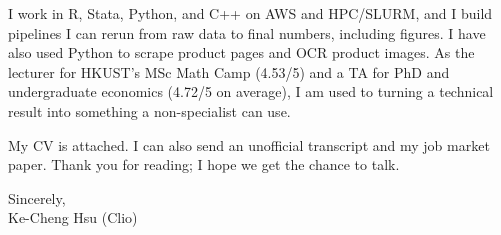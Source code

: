 \documentclass[11pt,letterpaper]{article}
\begin{document}
I work in R, Stata, Python, and C++ on AWS and HPC/SLURM, and I build pipelines I can rerun from raw data to final numbers, including figures. I have also used Python to scrape product pages and OCR product images. As the lecturer for HKUST's MSc Math Camp (4.53/5) and a TA for PhD and undergraduate economics (4.72/5 on average), I am used to turning a technical result into something a non-specialist can use.

My CV is attached. I can also send an unofficial transcript and my job market paper. Thank you for reading; I hope we get the chance to talk.

\vspace{0.7em}
Sincerely,\\[1.0em]
Ke-Cheng Hsu (Clio)
\end{document}
